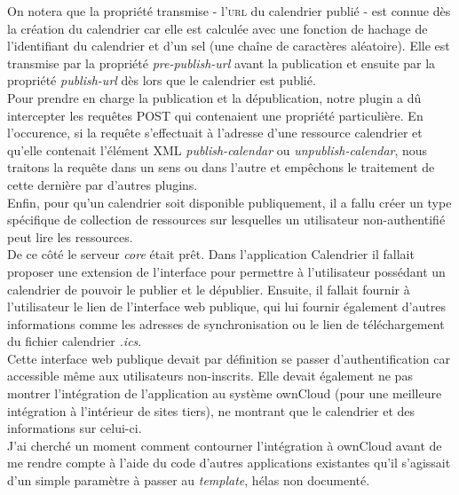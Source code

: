 \documentclass[10pt,a4paper, twoside]{report}
\begin{document}
	On notera que la propriété transmise - l'\textsc{url} du calendrier publié - est connue dès la création du calendrier car elle est calculée avec une fonction de hachage de l'identifiant du calendrier et d'un sel (une chaîne de caractères aléatoire).
	Elle est transmise par la propriété \textit{pre-publish-url} avant la publication et ensuite par la propriété \textit{publish-url} dès lors que le calendrier est publié.
	\\
	
	Pour prendre en charge la publication et la dépublication, notre plugin a dû intercepter les requêtes POST qui contenaient une propriété particulière.
	En l'occurence, si la requête s'effectuait à l'adresse d'une ressource calendrier et qu'elle contenait l'élément XML \textit{publish-calendar} ou \textit{unpublish-calendar}, nous traitons la requête dans un sens ou dans l'autre et empêchons le traitement de cette dernière par d'autres plugins.
	\\
	
	Enfin, pour qu'un calendrier soit disponible publiquement, il a fallu créer un type spécifique de collection de ressources sur lesquelles un utilisateur non-authentifié peut lire les ressources.
	\\
	
	De ce côté le serveur \textit{core} était prêt. Dans l'application Calendrier il fallait proposer une extension de l'interface pour permettre à l'utilisateur possédant un calendrier de pouvoir le publier et le dépublier. Ensuite, il fallait fournir à l'utilisateur le lien de l'interface web publique, qui lui fournir également d'autres informations comme les adresses de synchronisation ou le lien de téléchargement du fichier calendrier \textit{.ics}.
	\\
	
	Cette interface web publique devait par définition se passer d'authentification car accessible même aux utilisateurs non-inscrits.
	Elle devait également ne pas montrer l'intégration de l'application au système ownCloud (pour une meilleure intégration à l'intérieur de sites tiers), ne montrant que le calendrier et des informations sur celui-ci.
	\\
	
	J'ai cherché un moment comment contourner l'intégration à ownCloud avant de me rendre compte à l'aide du code d'autres applications existantes qu'il s'agissait d'un simple paramètre à passer au \textit{template}, hélas non documenté.
	\\
	
\end{document}
